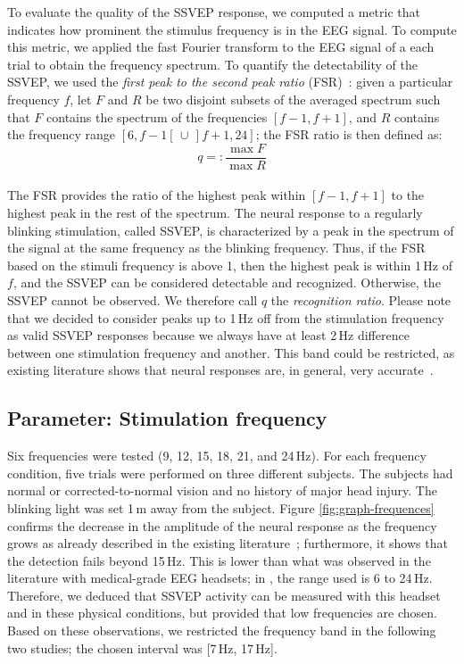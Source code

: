\documentclass[smallextended]{svjour3}
\begin{document}
To evaluate the quality of the SSVEP response, we computed a metric that indicates how prominent the stimulus frequency is in the EEG signal.
To compute this metric, we applied the fast Fourier transform to the EEG signal of a each trial to obtain the frequency spectrum. 
To quantify the detectability of the SSVEP, we used the \textit{first peak to the second peak ratio} (FSR)~\cite{Zheng2010}:
given a particular frequency $f$, let $F$ and $R$ be two disjoint subsets of the averaged spectrum such that $F$ contains the spectrum of the frequencies $[f-1, f+1]$, and $R$ contains the frequency range $[6, f-1[ \,\cup\, ]f+1, 24]$; the FSR ratio is then defined as:
\begin{equation}
\label{recog_rat}
q =:\frac{\max F}{\max R}
\end{equation}
\\
The FSR provides the ratio of the highest peak within $[f-1, f+1]$ to the highest peak in the rest of the spectrum. 
The neural response to a regularly blinking stimulation, called SSVEP, is characterized by a peak in the spectrum of the signal at the same frequency as the blinking frequency. 
Thus, if the FSR based on the stimuli frequency is above 1, then the highest peak is within 1\,Hz of $f$, and the SSVEP can be considered detectable and recognized. 
Otherwise, the SSVEP cannot be observed. 
We therefore call $q$ the \textit{recognition ratio}.
Please note that we decided to consider peaks up to 1\,Hz off from the stimulation frequency as valid SSVEP responses because we always have at least 2\,Hz difference between one stimulation frequency and another. 
This band could be restricted, as existing literature shows that neural responses are, in general, very accurate~\cite{SSVEPfiability}.

\subsection{Parameter: Stimulation frequency}
Six frequencies were tested (9, 12, 15, 18, 21, and 24\,Hz). For each frequency condition, five trials were performed on three different subjects. The subjects had normal or corrected-to-normal vision and no history of major head injury. The blinking light was set 1\,m away from the subject. 
Figure \ref{fig:graph-frequences} confirms the decrease in the amplitude of the neural response as the frequency grows as already described in the existing literature~\cite{herrmann2001}; furthermore, it shows that the detection fails beyond 15\,Hz. 
This is lower than what was observed in the literature with medical-grade EEG headsets; in \cite{SSVEPfiability}, the range used is 6 to 24\,Hz. Therefore, we deduced that SSVEP activity can be measured with this headset and in these physical conditions, but provided that low frequencies are chosen.
Based on these observations, we restricted the frequency band in the following two studies; the chosen interval was [7\,Hz, 17\,Hz].
\end{document}
